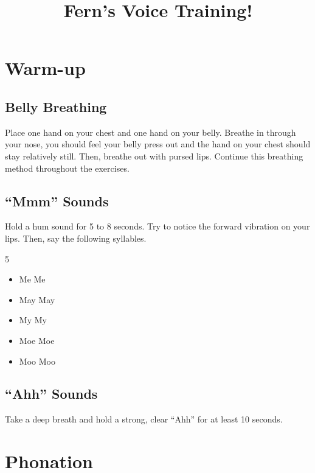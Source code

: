 \documentclass{article}
\title{Fern's Voice Training!}
\author{}
\date{}
\begin{document}
\maketitle

\section*{Warm-up}
\subsection*{Belly Breathing}
Place one hand on your chest and one hand on your belly.
Breathe in through your nose, you should feel your belly press out and the hand on your chest should stay relatively still.
Then, breathe out with pursed lips.
Continue this breathing method throughout the exercises.

\subsection*{\enquote{Mmm} Sounds}
Hold a hum sound for 5 to 8 seconds.
Try to notice the forward vibration on your lips.
Then, say the following syllables.
\begin{multicols}{5}
    \begin{itemize}
        \item Me Me
        \item May May
        \item My My
        \item Moe Moe
        \item Moo Moo
    \end{itemize}
\end{multicols}

\subsection*{\enquote{Ahh} Sounds}
Take a deep breath and hold a strong, clear \enquote{Ahh} for at least 10 seconds.

\pagebreak
\section*{Phonation}
\end{document}
